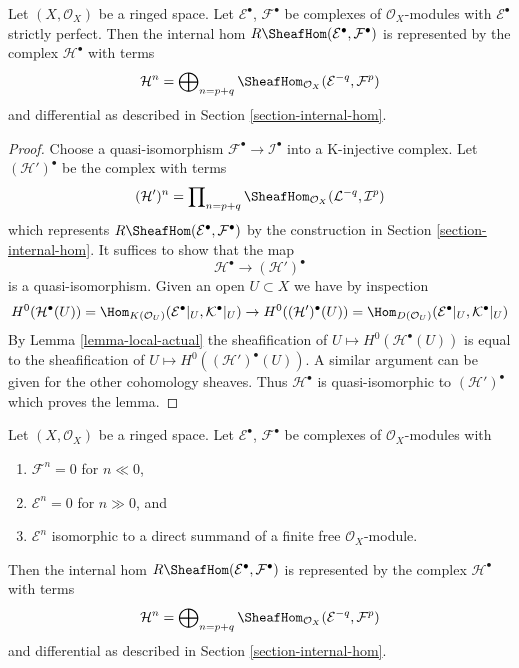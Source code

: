 \begin{lemma}
\label{lemma-Rhom-strictly-perfect}
Let $(X, \mathcal{O}_X)$ be a ringed space.
Let $\mathcal{E}^\bullet$, $\mathcal{F}^\bullet$ be complexes
of $\mathcal{O}_X$-modules with $\mathcal{E}^\bullet$ strictly perfect.
Then the internal hom $R\SheafHom(\mathcal{E}^\bullet, \mathcal{F}^\bullet)$
is represented by the complex $\mathcal{H}^\bullet$ with terms
$$
\mathcal{H}^n =
\bigoplus\nolimits_{n = p + q}
\SheafHom_{\mathcal{O}_X}(\mathcal{E}^{-q}, \mathcal{F}^p)
$$
and differential as described in Section \ref{section-internal-hom}.
\end{lemma}

\begin{proof}
Choose a quasi-isomorphism $\mathcal{F}^\bullet \to \mathcal{I}^\bullet$
into a K-injective complex. Let $(\mathcal{H}')^\bullet$ be the
complex with terms
$$
(\mathcal{H}')^n =
\prod\nolimits_{n = p + q}
\SheafHom_{\mathcal{O}_X}(\mathcal{L}^{-q}, \mathcal{I}^p)
$$
which represents $R\SheafHom(\mathcal{E}^\bullet, \mathcal{F}^\bullet)$
by the construction in Section \ref{section-internal-hom}. It suffices
to show that the map
$$
\mathcal{H}^\bullet \longrightarrow (\mathcal{H}')^\bullet
$$
is a quasi-isomorphism. Given an open $U \subset X$ we have
by inspection
$$
H^0(\mathcal{H}^\bullet(U)) =
\Hom_{K(\mathcal{O}_U)}(\mathcal{E}^\bullet|_U, \mathcal{K}^\bullet|_U)
\to
H^0((\mathcal{H}')^\bullet(U)) =
\Hom_{D(\mathcal{O}_U)}(\mathcal{E}^\bullet|_U, \mathcal{K}^\bullet|_U)
$$
By Lemma \ref{lemma-local-actual} the sheafification of
$U \mapsto H^0(\mathcal{H}^\bullet(U))$
is equal to the sheafification of
$U \mapsto H^0((\mathcal{H}')^\bullet(U))$. A similar argument can be
given for the other cohomology sheaves. Thus $\mathcal{H}^\bullet$
is quasi-isomorphic to $(\mathcal{H}')^\bullet$ which proves the lemma.
\end{proof}

\begin{lemma}
\label{lemma-Rhom-complex-of-direct-summands-finite-free}
Let $(X, \mathcal{O}_X)$ be a ringed space.
Let $\mathcal{E}^\bullet$, $\mathcal{F}^\bullet$ be complexes
of $\mathcal{O}_X$-modules with
\begin{enumerate}
\item $\mathcal{F}^n = 0$ for $n \ll 0$,
\item $\mathcal{E}^n = 0$ for $n \gg 0$, and
\item $\mathcal{E}^n$ isomorphic to a direct summand of a finite
free $\mathcal{O}_X$-module.
\end{enumerate}
Then the internal hom $R\SheafHom(\mathcal{E}^\bullet, \mathcal{F}^\bullet)$
is represented by the complex $\mathcal{H}^\bullet$ with terms
$$
\mathcal{H}^n =
\bigoplus\nolimits_{n = p + q}
\SheafHom_{\mathcal{O}_X}(\mathcal{E}^{-q}, \mathcal{F}^p)
$$
and differential as described in Section \ref{section-internal-hom}.
\end{lemma}


